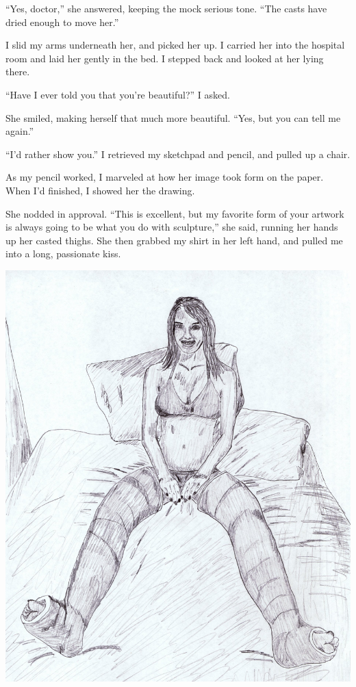 ``Yes, doctor,'' she answered, keeping the mock serious tone. ``The casts have dried enough to
move her.''

I slid my arms underneath her, and picked her up. I carried her into the hospital room and
laid her gently in the bed. I stepped back and looked at her lying there.

``Have I ever told you that you're beautiful?'' I asked.

She smiled, making herself that much more beautiful. ``Yes, but you can tell me again.''

``I'd rather show you.'' I retrieved my sketchpad and pencil, and pulled up a chair.

As my pencil worked, I marveled at how her image took form on the paper. When I'd finished,
I showed her the drawing.

She nodded in approval. ``This is excellent, but my favorite form of your artwork is always
going to be what you do with sculpture,'' she said, running her hands up her casted thighs. She
then grabbed my shirt in her left hand, and pulled me into a long, passionate kiss.

\newpage
\begin{center}
\includegraphics[width=\textwidth]{images/kicks34.jpg}
\end{center}
